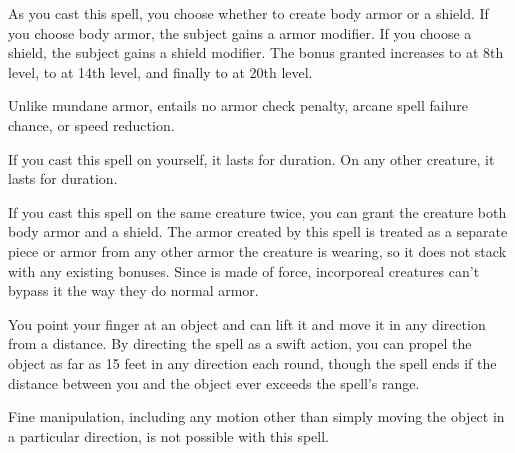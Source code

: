 \spellrng{\rngclose}
\begin{spelleffect}
    As you cast this spell, you choose whether to create body armor or a shield. If you choose body armor, the subject gains a  armor modifier. If you choose a shield, the subject gains a  shield modifier. The bonus granted increases to  at 8th level, to  at 14th level, and finally to  at 20th level. 
  \par Unlike mundane armor,  entails no armor check penalty, arcane spell failure chance, or speed reduction.
  \par If you cast this spell on yourself, it lasts for \durlong duration. On any other creature, it lasts for \durshort duration.
\end{spelleffect}
\begin{spellnotes}
    If you cast this spell on the same creature twice, you can grant the creature both body armor and a shield. The armor created by this spell is treated as a separate piece or armor from any other armor the creature is wearing, so it does not stack with any existing bonuses. Since  is made of force, incorporeal creatures can't bypass it the way they do normal armor.
\end{spellnotes}

\spellrng{\rngclose}
\spelldur{\durshort}
\begin{spelleffect}
  You point your finger at an object and can lift it and move it in any direction from a distance. By directing the spell as a swift action, you can propel the object as far as 15 feet in any direction each round, though the spell ends if the distance between you and the object ever exceeds the spell's range.
\end{spelleffect}
\begin{spellnotes}
  Fine manipulation, including any motion other than simply moving the object in a particular direction, is not possible with this spell.
\end{spellnotes}

